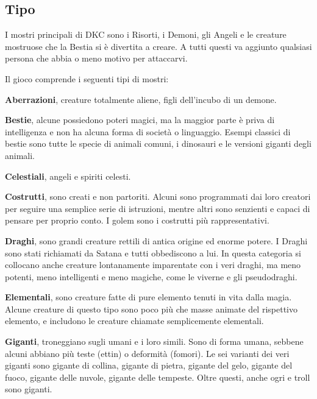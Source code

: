 \documentclass[12pt,a4paper,twoside,openany]{book}
\begin{document}
\medskip


\begin{multicols}{2}

\subsection{Tipo}

I mostri principali di DKC sono i Risorti, i Demoni, gli Angeli e le creature mostruose che la Bestia si è divertita a creare. A tutti questi va aggiunto qualsiasi persona che abbia o meno motivo per attaccarvi.


Il gioco comprende i seguenti tipi di mostri:

\smallskip\textbf{Aberrazioni}, creature totalmente aliene, figli dell'incubo di un demone.

\smallskip\textbf{Bestie},  alcune possiedono poteri magici, ma la maggior parte è priva di intelligenza e non ha alcuna forma di società o linguaggio. Esempi classici di bestie sono tutte le specie di animali comuni, i dinosauri e le versioni giganti degli animali.

\smallskip\textbf{Celestiali}, angeli e spiriti celesti.

\smallskip\textbf{Costrutti}, sono creati e non partoriti. Alcuni sono programmati dai loro creatori per seguire una semplice serie di istruzioni, mentre altri sono senzienti e capaci di pensare per proprio conto. I golem sono i costrutti più rappresentativi.

\smallskip\textbf{Draghi}, sono grandi creature rettili di antica origine ed enorme potere. I Draghi sono stati richiamati da Satana e tutti obbediscono a lui. In questa categoria si collocano anche creature lontanamente imparentate con i veri draghi, ma meno potenti, meno intelligenti e meno magiche, come le viverne e gli pseudodraghi.

\smallskip\textbf{Elementali}, sono creature fatte di pure elemento tenuti in vita dalla magia.
Alcune creature di questo tipo sono poco più che masse animate del rispettivo elemento, e includono le creature chiamate semplicemente elementali. 

\smallskip\textbf{Giganti}, troneggiano sugli umani e i loro simili. Sono di forma umana, sebbene alcuni abbiano più teste (ettin) o deformità (fomori). Le sei varianti dei veri giganti sono gigante di collina, gigante di pietra, gigante del gelo, gigante del fuoco, gigante delle nuvole, gigante delle tempeste. Oltre questi, anche ogri e troll sono giganti.


\end{multicols}
\end{document}
